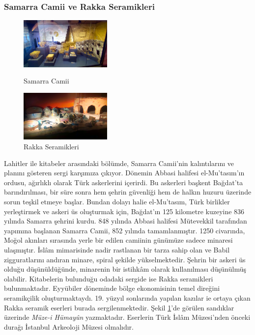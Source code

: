 \subsubsection{Samarra Camii ve Rakka Seramikleri}
\begin{figure}
    \includegraphics[width=0.4\textwidth]{assets/samarra.jpg}
    \caption{Samarra Camii}
    \label{fig:samarra}
    \vspace{10pt}
    \includegraphics[width=0.4\textwidth]{assets/raqqa.jpg}
    \caption{Rakka Seramikleri}
    \label{fig:raqqa}
\end{figure}
\indent Lahitler ile kitabeler arasındaki bölümde, Samarra Camii'nin kalıntılarını ve planını gösteren sergi karşımıza çıkıyor. Dönemin Abbasi halifesi el-Mu'tasım'ın ordusu, ağırlıklı olarak Türk askerlerini içerirdi. Bu askerleri başkent Bağdat'ta barındırılması, bir süre sonra hem şehrin güvenliği hem de halkın huzuru üzerinde sorun teşkil etmeye başlar. Bundan dolayı halie el-Mu'tasım, Türk birlikler yerleştirmek ve askeri üs oluşturmak için, Bağdat'ın 125 kilometre kuzeyine 836 yılında Samarra şehrini kurdu. 848 yılında Abbasi halifesi Mütevekkil tarafından yapımına başlanan Samarra Camii, 852 yılında tamamlanmıştır. 1250 civarında, Moğol akınları sırasında yerle bir edilen camiinin günümüze sadece minaresi ulaşmıştır. İslâm mimarisinde nadir rastlanan bir tarza sahip olan ve Babil zigguratlarını andıran minare, spiral şekilde yükselmektedir. Şehrin bir askeri üs olduğu düşünüldüğünde, minarenin bir istihkâm olarak kullanılması düşünülmüş olabilir.\newline
\indent Kitabelerin bulunduğu odadaki sergide ise Rakka seramikleri bulunmaktadır. Eyyübiler döneminde bölge ekonomisinin temel direğini seramikçilik oluşturmaktaydı. 19. yüzyıl sonlarında yapılan kazılar ie ortaya çıkan Rakka seramik eserleri burada sergilenmektedir. Şekil \ref{fig:raqqa}'de görülen sandıklar üzerinde \textit{Müze-i Hümayûn} yazmaktadır. Eserlerin Türk İslâm Müzesi'nden önceki durağı İstanbul Arkeoloji Müzesi olmalıdır.\newline 
